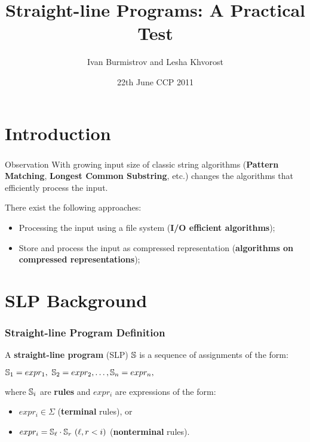 \documentclass{beamer}
\title{Straight-line Programs: A Practical Test}
\author{Ivan Burmistrov \inst{\mbox{\textdagger}} and Lesha Khvorost
\inst{\mbox{\textdagger}}}
\institute
{
\inst{\mbox{\textdagger}}
Department of Mathematics and Mechanics\\
Ural State University}
\date{22th June CCP 2011}
\begin{document}
\begin{frame}
\titlepage
\end{frame}

\section{Introduction}

\begin{frame}
\frametitle{}

\begin{block}{Observation}
With growing input size of classic string algorithms (\textbf{Pattern
Matching}, \textbf{Longest Common Substring}, etc.) changes the algorithms that
efficiently process the input.
\end{block}

\pause
There exist the following approaches:

\begin{itemize}
  \item Processing the input using a file system (\textbf{I/O efficient
  algorithms});
  \pause
  \item Store and process the input as compressed  
  representation (\textbf{algorithms on compressed representations});
\end{itemize}
\end{frame}

\section{SLP Background}

\begin{frame}
\frametitle{Straight-line Program Definition}

\begin{definition}
	A \textbf{straight-line program} (SLP) $\mathbb{S}$ is a sequence of assignments
	of the form:
	
	\begin{center}
		$\mathbb{S}_1 = expr_1,\ \mathbb{S}_2 = expr_2, \dots, \mathbb{S}_n = expr_n,$
	\end{center}
	where $\mathbb{S}_i$ are \textbf{rules} and $expr_i$ are expressions of the form:
	\begin{itemize}
		\item $expr_i \in \Sigma$ (\textbf{terminal} rules), or
		\item $expr_i = \slp{S}_\ell\cdot \slp{S}_r \ (\ell, r < i)$
		(\textbf{nonterminal} rules).
	\end{itemize}
\end{definition}

\end{frame}
\end{document}

